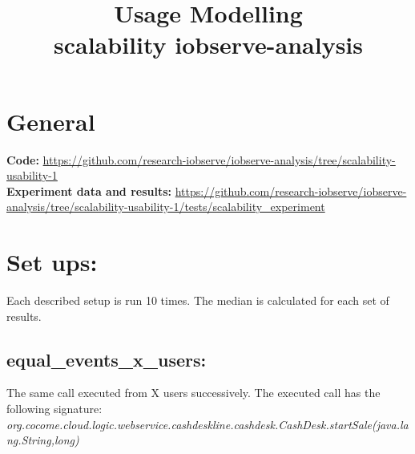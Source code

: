 \documentclass[10pt,a4paper]{article}
\begin{document}
	\title{Usage Modelling\\scalability iobserve-analysis}
	\date{}
	\maketitle
	
	\section{General}
	\textbf{Code:} \url{https://github.com/research-iobserve/iobserve-analysis/tree/scalability-usability-1}\\
	\textbf{Experiment data and results:} \url{https://github.com/research-iobserve/iobserve-analysis/tree/scalability-usability-1/tests/scalability_experiment}
	
	\section{Set ups:}
	Each described setup is run 10 times. The median is calculated for each set of results.
	
	\subsection{equal\_events\_x\_users:}
	The same call executed from X users successively. The executed call has the following signature:\\ \emph{org.cocome.cloud.logic.webservice.cashdeskline.cashdesk.CashDesk.startSale(java.lang.String,long)}
	
\end{document}
